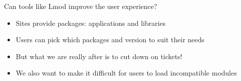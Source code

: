 \documentclass{beamer}
\begin{document}
\begin{frame}{Can tools like Lmod improve the user experience?}
  \begin{itemize}
    \item Sites provide packages: applications and libraries
    \item Users can pick which packages and version to suit their needs
    \item But what we are really after is to cut down on tickets!
    \item We also want to make it difficult for users to load
      incompatible modules
  \end{itemize}
\end{frame}
\end{document}
